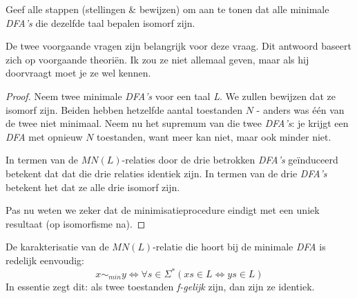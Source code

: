 \begin{quest}
  Geef alle stappen (stellingen \& bewijzen) om aan te tonen dat alle minimale \emph{DFA's} die dezelfde taal bepalen isomorf zijn.
\end{quest}

De twee voorgaande vragen zijn belangrijk voor deze vraag. Dit antwoord baseert zich op voorgaande theori\"en. Ik zou ze niet allemaal geven, maar als hij doorvraagt moet je ze wel kennen.

\begin{proof}

  Neem twee minimale \emph{DFA's} voor een taal \emph{L}. We zullen bewijzen dat ze isomorf zijn. Beiden hebben hetzelfde aantal toestanden $N$ - anders was \'e\'en van de twee niet minimaal. Neem nu het supremum van die twee \emph{DFA's}: je krijgt een \emph{DFA} met opnieuw $N$ toestanden, want meer kan niet, maar ook minder niet.

  In termen van de $MN(L)$-relaties door de drie betrokken \emph{DFA's} ge\"induceerd betekent dat dat die drie relaties identiek zijn. In termen van de drie \emph{DFA's} betekent het dat ze alle drie isomorf zijn.

  Pas nu weten we zeker dat de minimisatieprocedure eindigt met een uniek resultaat (op isomorfisme na).
\end{proof}

De karakterisatie van de $MN(L)$-relatie die hoort bij de minimale \emph{DFA} is redelijk eenvoudig:
$$x \sim_{min} y \iff \forall s \in \Sigma^*(xs \in L \iff ys \in L)$$
In essentie zegt dit: als twee toestanden \emph{f-gelijk} zijn, dan zijn ze identiek.

